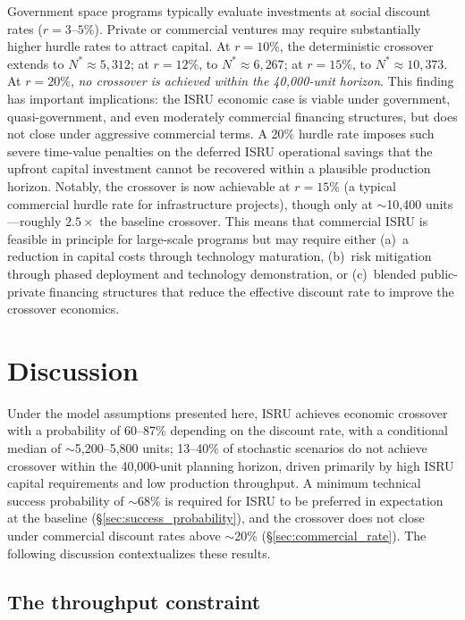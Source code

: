 \documentclass[preprint,12pt]{elsarticle}
\begin{document}
Government space programs typically evaluate investments at social discount rates ($r = 3$--$5\%$). Private or commercial ventures may require substantially higher hurdle rates to attract capital. At $r = 10\%$, the deterministic crossover extends to $N^* \approx 5{,}312$; at $r = 12\%$, to $N^* \approx 6{,}267$; at $r = 15\%$, to $N^* \approx 10{,}373$. At $r = 20\%$, \emph{no crossover is achieved within the 40{,}000-unit horizon}. This finding has important implications: the ISRU economic case is viable under government, quasi-government, and even moderately commercial financing structures, but does not close under aggressive commercial terms. A 20\% hurdle rate imposes such severe time-value penalties on the deferred ISRU operational savings that the upfront capital investment cannot be recovered within a plausible production horizon. Notably, the crossover is now achievable at $r = 15\%$ (a typical commercial hurdle rate for infrastructure projects), though only at $\sim$10{,}400 units---roughly $2.5\times$ the baseline crossover. This means that commercial ISRU is feasible in principle for large-scale programs but may require either (a)~a reduction in capital costs through technology maturation, (b)~risk mitigation through phased deployment and technology demonstration, or (c)~blended public-private financing structures that reduce the effective discount rate to improve the crossover economics.

\section{Discussion}
\label{sec:discussion}

Under the model assumptions presented here, ISRU achieves economic crossover with a probability of 60--87\% depending on the discount rate, with a conditional median of $\sim$5{,}200--5{,}800 units; 13--40\% of stochastic scenarios do not achieve crossover within the 40{,}000-unit planning horizon, driven primarily by high ISRU capital requirements and low production throughput. A minimum technical success probability of $\sim$68\% is required for ISRU to be preferred in expectation at the baseline (\S\ref{sec:success_probability}), and the crossover does not close under commercial discount rates above $\sim$20\% (\S\ref{sec:commercial_rate}). The following discussion contextualizes these results.

\subsection{The throughput constraint}
\label{sec:throughput}
\end{document}
